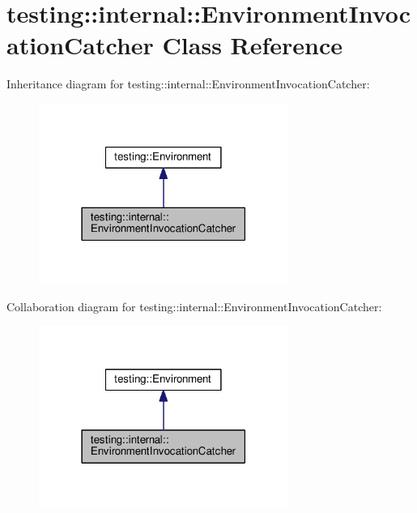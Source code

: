 \hypertarget{classtesting_1_1internal_1_1EnvironmentInvocationCatcher}{}\section{testing\+:\+:internal\+:\+:Environment\+Invocation\+Catcher Class Reference}
\label{classtesting_1_1internal_1_1EnvironmentInvocationCatcher}


Inheritance diagram for testing\+:\+:internal\+:\+:Environment\+Invocation\+Catcher\+:
\nopagebreak
\begin{figure}[H]
\begin{center}
\leavevmode
\includegraphics[width=231pt]{classtesting_1_1internal_1_1EnvironmentInvocationCatcher__inherit__graph}
\end{center}
\end{figure}


Collaboration diagram for testing\+:\+:internal\+:\+:Environment\+Invocation\+Catcher\+:
\nopagebreak
\begin{figure}[H]
\begin{center}
\leavevmode
\includegraphics[width=231pt]{classtesting_1_1internal_1_1EnvironmentInvocationCatcher__coll__graph}
\end{center}
\end{figure}
